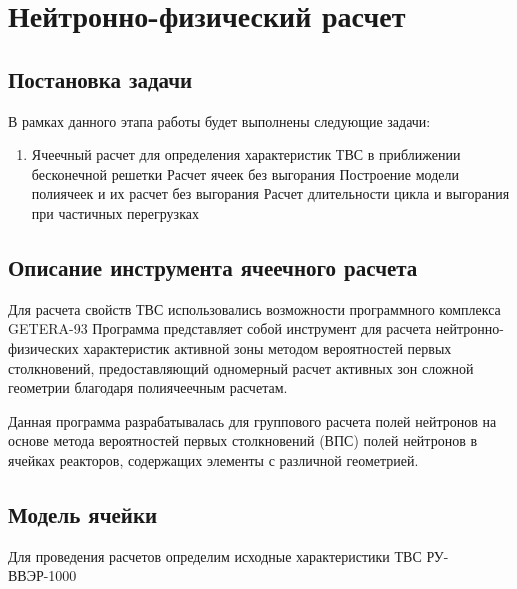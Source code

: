 \section{Нейтронно-физический расчет}

\subsection{Постановка задачи}
В рамках данного этапа работы будет выполнены следующие задачи:
\begin{enumerate}
    \item Ячеечный расчет для определения характеристик ТВС в приближении бесконечной решетки
        \subitem Расчет ячеек без выгорания
        \subitem Построение модели полиячеек и их расчет без выгорания
        \subitem Расчет длительности цикла и выгорания при частичных перегрузках
\end{enumerate}

\subsection{Описание инструмента ячеечного расчета}
Для расчета свойств ТВС использовались возможности программного комплекса GETERA-93 %
Программа представляет собой инструмент для расчета нейтронно-физических характеристик активной зоны методом вероятностей первых столкновений, предоставляющий одномерный расчет активных зон сложной геометрии благодаря полиячеечным расчетам.

Данная программа разрабатывалась для группового расчета полей нейтронов на основе метода вероятностей первых столкновений (ВПС) полей нейтронов в ячейках реакторов, содержащих элементы с различной геометрией.
\subsection{Модель ячейки}
Для проведения расчетов определим исходные характеристики ТВС РУ-ВВЭР-1000 %

